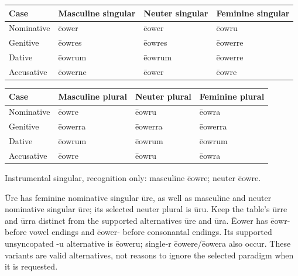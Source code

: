 \par\begingroup
\fontsize{10.5}{13.2}\selectfont
\setlength{\LTleft}{0pt}\setlength{\LTright}{\fill}
\noindent
\begin{tabular}{@{}>{\raggedright\arraybackslash}p{22.0mm}>{\raggedright\arraybackslash}p{31.188mm}>{\raggedright\arraybackslash}p{31.188mm}>{\raggedright\arraybackslash}p{31.188mm}@{}}
\toprule
\textbf{Case} & \textbf{Masculine singular} & \textbf{Neuter singular} & \textbf{Feminine singular} \\
\midrule
Nominative & ēower & ēower & ēowru \\
Genitive & ēowres & ēowres & ēowerre \\
Dative & ēowrum & ēowrum & ēowerre \\
Accusative & ēowerne & ēower & ēowre \\
\bottomrule
\end{tabular}
\par\endgroup
\par\addvspace{5pt}
\par\begingroup
\fontsize{10.5}{13.2}\selectfont
\setlength{\LTleft}{0pt}\setlength{\LTright}{\fill}
\noindent
\begin{tabular}{@{}>{\raggedright\arraybackslash}p{22.0mm}>{\raggedright\arraybackslash}p{31.188mm}>{\raggedright\arraybackslash}p{31.188mm}>{\raggedright\arraybackslash}p{31.188mm}@{}}
\toprule
\textbf{Case} & \textbf{Masculine plural} & \textbf{Neuter plural} & \textbf{Feminine plural} \\
\midrule
Nominative & ēowre & ēowru & ēowra \\
Genitive & ēowerra & ēowerra & ēowerra \\
Dative & ēowrum & ēowrum & ēowrum \\
Accusative & ēowre & ēowru & ēowra \\
\bottomrule
\end{tabular}
\par\endgroup
Instrumental singular, recognition only: masculine ēowre; neuter ēowre.

Ūre has feminine nominative singular ūre, as well as masculine and neuter nominative singular ūre; its selected neuter plural is ūru. Keep the table’s ūrre and ūrra distinct from the supported alternatives ūre and ūra. Ēower has ēowr- before vowel endings and ēower- before consonantal endings. Its supported unsyncopated -u alternative is ēoweru; single-r ēowere/\allowbreak{}ēowera also occur. These variants are valid alternatives, not reasons to ignore the selected paradigm when it is requested.

